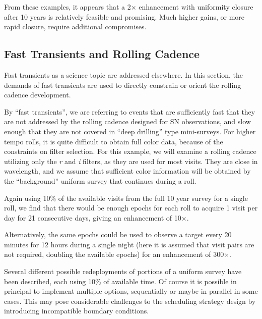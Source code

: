 From these examples, it appears that a 2$\times$ enhancement with uniformity closure after 10 years is relatively feasible and promising.  Much higher gains, or more rapid closure, require additional compromises.


\subsection{ Fast Transients and Rolling Cadence}
\label{sec:rolling:transients}


Fast transients as a science topic are addressed elsewhere. In this section, the demands of fast transients are used to directly constrain or
orient the rolling cadence development.

By ``fast transients'', we are referring to events that are sufficiently fast that they are not addressed by the rolling cadence designed for SN observations, and slow enough that they are not covered in ``deep drilling'' type mini-surveys.  For higher tempo rolls, it is quite difficult to obtain full color data, because of the constraints on filter selection.  For this example, we will examine a rolling cadence utilizing only the {\it r} and {\it i} filters, as they are used for most visits. They are close in wavelength, and we assume that sufficient color information will be obtained by the ``background'' uniform survey that continues during a roll.

Again using 10\% of the available visits from the full 10 year survey for a single roll, we find that there would be enough epochs for each roll to acquire 1 visit per day for 21 consecutive days, giving an enhancement of 10$\times$.

Alternatively, the same epochs could be used to observe a target every 20 minutes for 12 hours during a single night (here it is assumed that visit pairs are not required, doubling the available epochs) for an enhancement of 300$\times$.

Several different possible redeployments of portions of a uniform survey have been described, each using 10\% of available time.  Of course it is possible in principal to implement multiple options, sequentially or maybe in parallel in some cases. This may pose considerable challenges to the scheduling strategy design by introducing incompatible boundary conditions.


